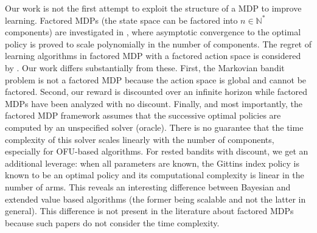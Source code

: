 Our work is not the first attempt to exploit the structure of a MDP to improve
learning.  Factored MDPs (the state space can be
factored into $n\in\mathbb{N}^*$ components) are investigated in
\cite{guestrin2003efficient}, where asymptotic convergence to
the optimal policy is proved to scale polynomially in the number of components.
The regret of learning algorithms in factored MDP with a factored action space
is considered by 
\cite{tian2020towards,rosenberg2020oracle,xu2020reinforcement,osband2014near}. Our work differs substantially from these. 
First,  the Markovian bandit problem   is not a  factored MDP because  the action
space is global and  cannot be factored. 
Second, our reward is discounted over an infinite horizon while  factored MDPs have been analyzed with no discount.
Finally, and most importantly, the factored MDP framework assumes that the successive optimal policies are  computed by an unspecified solver (oracle). There is no guarantee that the time complexity of this solver scales linearly with the number of components, especially for OFU-based
algorithms.
For rested bandits with discount, we get an  additional leverage: when all parameters are known, the Gittins index policy is known to be an optimal policy and its computational complexity is linear in the number of arms. This reveals an interesting difference between Bayesian and extended value based algorithms (the former being scalable and not the latter in general). This difference is not present in the literature about factored MDPs because such papers do not consider the time complexity.

